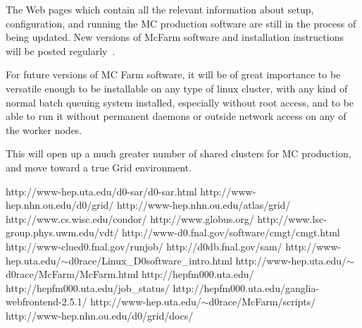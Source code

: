 \documentclass{revtex4}
\begin{document}
The Web pages which contain all the relevant information about setup, 
configuration, and running the MC production software are still in the
process of being updated.
New versions of McFarm software and installation instructions will be 
posted regularly~\cite{mcfarmscr,oud0griddoc}.

For future versions of MC Farm software, it will be of great importance 
to be versatile enough to be installable on any type of linux cluster,
with any kind of normal batch queuing system installed, 
especially without root access, and to be able to run it without permanent
daemons or outside network access on any of the worker nodes.

This will open up a much greater number of shared clusters for MC production,
and move toward a true Grid environment.


\begin{thebibliography}{99}

       http://www-hep.uta.edu/d0-sar/d0-sar.html
    http://www-hep.nhn.ou.edu/d0/grid/
 http://www-hep.nhn.ou.edu/atlas/grid/
      http://www.cs.wisc.edu/condor/
      http://www.globus.org/
         http://www.lsc-group.phys.uwm.edu/vdt/
      http://www-d0.fnal.gov/software/cmgt/cmgt.html
    http://www-clued0.fnal.gov/runjob/
         http://d0db.fnal.gov/sam/
  http://www-hep.uta.edu/$\sim$d0race/Linux\_D0software\_intro.html
      http://www-hep.uta.edu/$\sim$d0race/McFarm/McFarm.html
   http://hepfm000.uta.edu/
  http://hepfm000.uta.edu/job\_status/
  http://hepfm000.uta.edu/ganglia-webfrontend-2.5.1/
   http://www-hep.uta.edu/$\sim$d0race/McFarm/scripts/
 http://www-hep.nhn.ou.edu/d0/grid/docs/

\end{thebibliography}

\newpage
\end{document}
